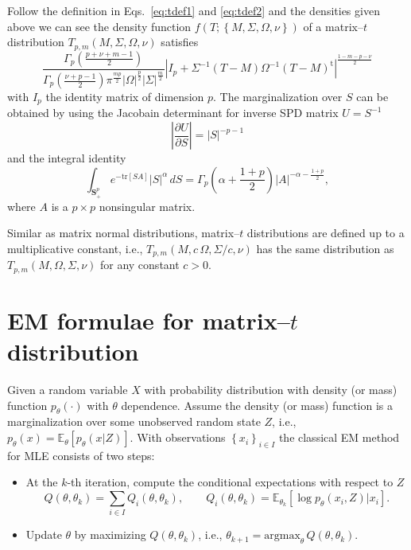 \documentclass[english,listof=totoc]{scrartcl}
\begin{document}
Follow the definition in Eqs.~\eqref{eq:tdef1} and \eqref{eq:tdef2} and the densities given above we can see the density function $f(T;\left\{M,\Sigma,\Omega,\nu\right\})$ of a matrix--$t$ distribution $T_{p,m}(M,\Sigma,\Omega,\nu)$ satisfies
\begin{equation}
\frac{\Gamma_{p}\left(\frac{p+\nu+m-1}{2}\right)}{\Gamma_{p}\left(\frac{\nu+p-1}{2}\right)\pi^{\frac{mp}{2}}|\Omega|^{\frac{p}{2}}|\Sigma|^{\frac{m}{2}}}
|I_p+\Sigma^{-1}(T-M)\Omega^{-1}(T-M)^{\textrm{t}}|^{\frac{1-m-p-\nu}{2}}
\label{eq:matrixtpdf}
\end{equation}
with $I_p$ the identity matrix of dimension $p$. The marginalization over $S$ can be obtained by using the Jacobain determinant for inverse SPD matrix $U=S^{-1}$
\begin{equation}
\left|\frac{\partial U}{\partial S}\right|=|S|^{-p-1}
\end{equation}
and the integral identity \citep{gupta1999matrix}
\begin{equation}
\int_{\mathbf{S}_+^p}e^{-\textrm{tr}[S A]}|S|^{\alpha}\,dS=\Gamma_{p}\left(\alpha+\frac{1+p}{2}\right)|A|^{-\alpha-\frac{1+p}{2}},\label{eq:intmultgammadef}
\end{equation}
where $A$ is a $p\times p$ nonsingular matrix.

Similar as matrix normal distributions, matrix--$t$ distributions are defined up to a multiplicative constant, i.e., $T_{p,m}(M,c\,\Omega,\Sigma/c,\nu)$ has the same distribution as $T_{p,m}(M,\Omega,\Sigma,\nu)$ for any constant $c>0$.

\section{EM formulae for matrix--$t$ distribution}\label{sec:EM}

Given a random variable $X$ with probability distribution with density (or mass) function $p_{\theta}(\cdot)$ with $\theta$ dependence. Assume the density (or mass) function is a marginalization over some unobserved random state $Z$, i.e., $p_{\theta}(x)=\mathbb{E}_{\theta}\left[p_{\theta}(x|Z)\right]$. With observations $\left\{x_i\right\}_{i\in I}$ the classical EM method for MLE consists of two steps:

\begin{itemize}
\item At the $k$-th iteration, compute the conditional expectations with respect to $Z$
\begin{equation}
Q(\theta,\theta_k)=\sum_{i\in I}Q_i(\theta,\theta_k),\qquad Q_i(\theta,\theta_k)=\mathbb{E}_{\theta_k}\left[\log p_{\theta}(x_i,Z)|x_i\right].
\end{equation}

\item Update $\theta$ by maximizing $Q(\theta,\theta_k)$, i.e., $\theta_{k+1} = \textrm{argmax}_{\theta}\,Q(\theta,\theta_k)$.
\end{itemize}
\end{document}
